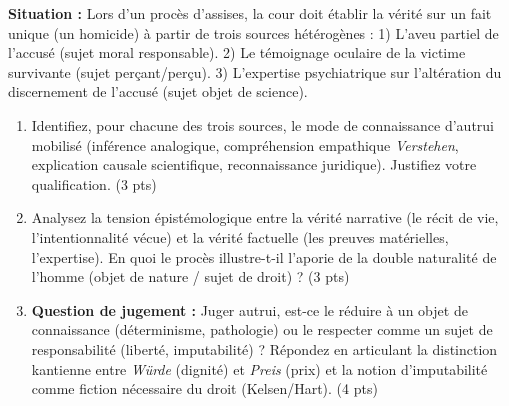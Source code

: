 \documentclass[11pt]{article}
\begin{document}
\begin{exercice}
\textbf{Situation :} Lors d'un procès d'assises, la cour doit établir la vérité sur un fait unique (un homicide) à partir de trois sources hétérogènes : 1) L'aveu partiel de l'accusé (sujet moral responsable). 2) Le témoignage oculaire de la victime survivante (sujet perçant/perçu). 3) L'expertise psychiatrique sur l'altération du discernement de l'accusé (sujet objet de science).

\begin{enumerate}
    \item Identifiez, pour chacune des trois sources, le \og mode de connaissance d'autrui \fg{} mobilisé (inférence analogique, compréhension empathique \textit{Verstehen}, explication causale scientifique, reconnaissance juridique). Justifiez votre qualification. (3 pts)
    \item Analysez la tension épistémologique entre la \og vérité narrative \fg{} (le récit de vie, l'intentionnalité vécue) et la \og vérité factuelle \fg{} (les preuves matérielles, l'expertise). En quoi le procès illustre-t-il l'aporie de la \og double naturalité \fg{} de l'homme (objet de nature / sujet de droit) ? (3 pts)
    \item \textbf{Question de jugement :} \og Juger autrui, est-ce le réduire à un objet de connaissance (déterminisme, pathologie) ou le respecter comme un sujet de responsabilité (liberté, imputabilité) ? \fg{} Répondez en articulant la distinction kantienne entre \textit{Würde} (dignité) et \textit{Preis} (prix) et la notion d'\og imputabilité \fg{} comme fiction nécessaire du droit (Kelsen/Hart). (4 pts)
\end{enumerate}
\end{exercice}
\end{document}
